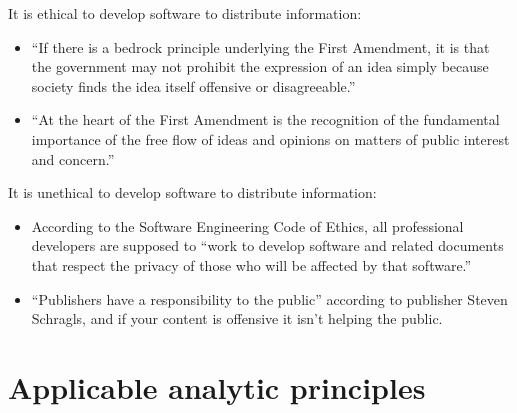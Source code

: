 \documentclass[11pt]{article}
\begin{document}
It is ethical to develop software to distribute information:
\begin{itemize}
\item ``If there is a bedrock principle underlying the First Amendment, it is that the government may not prohibit the expression of an idea simply because society finds the idea itself offensive or disagreeable.'' \cite[414]{1989texas}
\item ``At the heart of the First Amendment is the recognition of the fundamental importance of the free flow of ideas and opinions on matters of public interest and concern.'' \cite[51]{1988hustler}
\end{itemize}
It is unethical to develop software to distribute information:
\begin{itemize}
\item According to the Software Engineering Code of Ethics, all professional developers are supposed to ``work to develop software and related documents that respect the privacy of those who will be affected by that software.'' \cite[3.12]{secode}
\item ``Publishers have a responsibility to the public'' according to publisher Steven Schragls, and if your content is offensive it isn't helping the public. \cite[46]{hawker}
\end{itemize}

\section{Applicable analytic principles}
\end{document}
